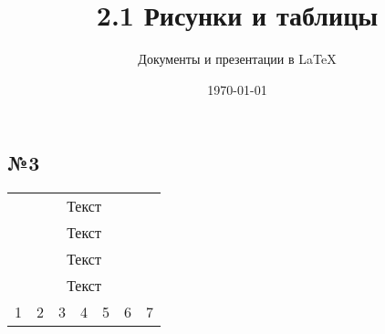 \documentclass[a4paper,12pt]{article}
\author{Документы и презентации в \LaTeX}
\title{2.1 Рисунки и таблицы}
\date{\today}
\begin{document}

\maketitle

\subsection{№3}

\begin{tabular}{ccccccc}
	\multicolumn{7}{|c|}{Текст}\\ 
	\multicolumn{7}{c}{Текст}\\ \hline 
	\multicolumn{7}{c}{Текст}\\
	\multicolumn{7}{|c|}{Текст}\\ \hline
	1 & 2 & 3 & 4 & 5 & 6 & 7 \\ \hline 
\end{tabular} 
\end{document}
